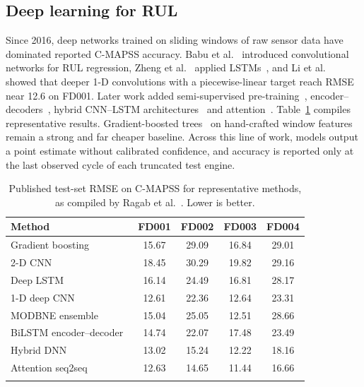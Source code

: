 \documentclass[pdflatex,sn-mathphys-num]{sn-jnl}
\begin{document}
\subsection{Deep learning for RUL}
Since 2016, deep networks trained on sliding windows of raw sensor data have dominated reported C-MAPSS accuracy. Babu et al.~\cite{babu2016cnn} introduced convolutional networks for RUL regression, Zheng et al.~\cite{zheng2017lstm} applied LSTMs~\cite{hochreiter1997lstm}, and Li et al.~\cite{li2018dcnn} showed that deeper 1-D convolutions with a piecewise-linear target reach RMSE near 12.6 on FD001. Later work added semi-supervised pre-training~\cite{listou2019semisup}, encoder--decoders~\cite{yu2019bilstmed}, hybrid CNN--LSTM architectures~\cite{aldulaimi2019hdnn} and attention~\cite{ragab2020ats2s}. Table~\ref{tab:literature} compiles representative results. Gradient-boosted trees~\cite{friedman2001gbm,ke2017lightgbm} on hand-crafted window features remain a strong and far cheaper baseline. Across this line of work, models output a point estimate without calibrated confidence, and accuracy is reported only at the last observed cycle of each truncated test engine.

\begin{table}[t]
\caption{Published test-set RMSE on C-MAPSS for representative methods, as compiled by Ragab et al.~\cite{ragab2020ats2s}. Lower is better.}\label{tab:literature}
\begin{tabular*}{\textwidth}{@{\extracolsep\fill}lcccc}
\toprule
Method & FD001 & FD002 & FD003 & FD004 \\
\midrule
Gradient boosting~\cite{zhang2016modbne}  & 15.67 & 29.09 & 16.84 & 29.01 \\
2-D CNN~\cite{babu2016cnn}               & 18.45 & 30.29 & 19.82 & 29.16 \\
Deep LSTM~\cite{zheng2017lstm}           & 16.14 & 24.49 & 16.81 & 28.17 \\
1-D deep CNN~\cite{li2018dcnn}           & 12.61 & 22.36 & 12.64 & 23.31 \\
MODBNE ensemble~\cite{zhang2016modbne}   & 15.04 & 25.05 & 12.51 & 28.66 \\
BiLSTM encoder--decoder~\cite{yu2019bilstmed} & 14.74 & 22.07 & 17.48 & 23.49 \\
Hybrid DNN~\cite{aldulaimi2019hdnn}      & 13.02 & 15.24 & 12.22 & 18.16 \\
Attention seq2seq~\cite{ragab2020ats2s}  & 12.63 & 14.65 & 11.44 & 16.66 \\
\botrule
\end{tabular*}
\end{table}
\end{document}
